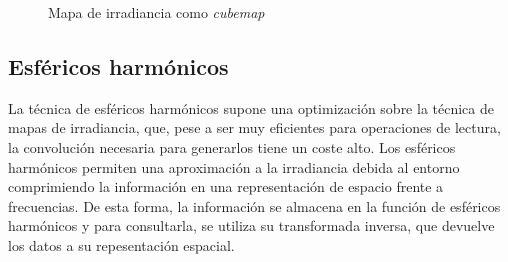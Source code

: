
            \begin{figure}[H]
                \vspace{0.5cm}
                \centering
                \caption{Mapa de irradiancia como \textit{cubemap}}
            \end{figure}
            \singlespacing

            \subsection*{Esf\'ericos harm\'onicos}
            La t\'ecnica de esf\'ericos harm\'onicos \autocite{sh} supone una optimizaci\'on sobre la t\'ecnica de mapas de irradiancia,
            que, pese a ser muy eficientes para operaciones de lectura, la convoluci\'on necesaria para generarlos tiene un coste alto.
            Los esf\'ericos harm\'onicos permiten una aproximaci\'on a la irradiancia debida al entorno comprimiendo la informaci\'on
            en una representaci\'on de espacio frente a frecuencias. De esta forma, la informaci\'on se almacena en la funci\'on de
            esf\'ericos harm\'onicos y para consultarla, se utiliza su transformada inversa, que devuelve los datos a su repesentaci\'on espacial.

